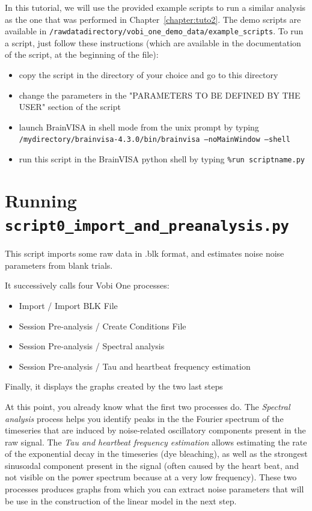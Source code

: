 In this tutorial, we will use the provided example scripts to run a similar analysis as the one that was performed in Chapter~\ref{chapter:tuto2}.
The demo scripts are available in \texttt{/rawdatadirectory/vobi\_one\_demo\_data/example\_scripts}.
To run a script, just follow these instructions (which are available in the documentation of the script, at the beginning of the file):

\begin{itemize}
   \item copy the script in the directory of your choice and go to this directory
   \item change the parameters in the "PARAMETERS TO BE DEFINED BY THE USER" section of the script
   \item launch BrainVISA in shell mode from the unix prompt by typing \texttt{/mydirectory/brainvisa-4.3.0/bin/brainvisa --noMainWindow --shell}
   \item run this script in the BrainVISA python shell by typing \texttt{\%run scriptname.py}
\end{itemize}



\section{Running \texttt{script0\_import\_and\_preanalysis.py}}

This script imports some raw data in .blk format, and estimates noise
noise parameters from blank trials.

It successively calls four Vobi One processes:
\begin{itemize}
  \item Import / Import BLK File
  \item Session Pre-analysis / Create Conditions File
  \item Session Pre-analysis / Spectral analysis
  \item Session Pre-analysis / Tau and heartbeat frequency estimation
\end{itemize}
Finally, it displays the graphs created by the two last steps

At this point, you already know what the first two processes do. The \textit{Spectral analysis} process helps you identify peaks in the the Fourier spectrum of the timeseries that are induced by noise-related oscillatory components present in the raw signal.
The \textit{Tau and heartbeat frequency estimation} allows estimating the rate of the exponential decay in the timeseries (dye bleaching), as well
as the strongest sinusoıdal component present in the signal (often caused by the heart beat, and not visible on the power spectrum because at a very low frequency).
These two processes produces graphs from which you can extract noise parameters that will be use in the construction of the linear model in the next step.

